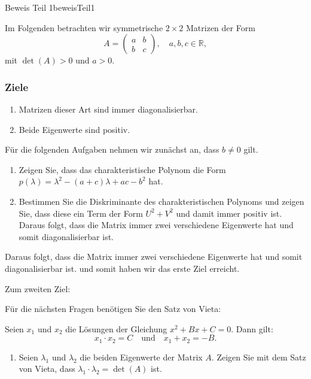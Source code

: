 \clearpage
\begin{LA}
	{Beweis Teil 1}{beweisTeil1}

	Im Folgenden betrachten wir symmetrische $2 \times 2$ Matrizen der Form
	\[
		A = \begin{pmatrix}
			a & b \\
			b & c
		\end{pmatrix}, \quad a, b, c \in \mathbb{R},
	\]
	mit $\det(A) > 0$ und $a > 0$.

	\subsubsection*{Ziele}
	\begin{enumerate}
		\item Matrizen dieser Art sind immer diagonalisierbar.
		\item Beide Eigenwerte sind positiv.
	\end{enumerate}

	Für die folgenden Aufgaben nehmen wir zunächst an, dass $b \neq 0$ gilt.
	\begin{enumerate}
		\item Zeigen Sie, dass das charakteristische Polynom die Form \(p(\lambda) = \lambda^2 - (a+c)\lambda + ac - b^2\) hat.
		\item Bestimmen Sie die Diskriminante des charakteristischen Polynoms und zeigen Sie, dass diese ein Term der Form \(U^2 + V^2\) und damit immer positiv ist.
		      Daraus folgt, dass die Matrix immer zwei verschiedene Eigenwerte hat und somit diagonalisierbar ist.
	\end{enumerate}

	Daraus folgt, dass die Matrix immer zwei verschiedene Eigenwerte hat und somit diagonalisierbar ist. und somit haben wir das erste Ziel erreicht.

	Zum zweiten Ziel:

	Für die nächsten Fragen benötigen Sie den Satz von Vieta:

	Seien \(x_1\) und \(x_2\) die Lösungen der Gleichung \(x^2 + Bx + C = 0\). Dann gilt:
	\[
		x_1 \cdot x_2 = C \quad \text{und} \quad x_1 + x_2 = -B.
	\]

	\begin{enumerate}[resume]
		\item Seien \(\lambda_1\) und \(\lambda_2\) die beiden Eigenwerte der Matrix \(A\). Zeigen Sie mit dem Satz von Vieta, dass \(\lambda_1 \cdot \lambda_2 = \det(A)\) ist.


\end{enumerate}
\end{LA}
